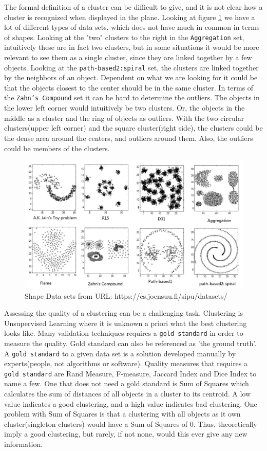 \documentclass[a4paper,10pt]{article}
\theoremstyle{plain}
\theoremstyle{definition}
\begin{document}
The formal definition of a cluster can be difficult to give, and it is not clear how a cluster is recognized when displayed in the plane. Looking at figure \ref{shapeDataSets} we have a lot of different types of data sets, which does not have much in common in terms of shapes. Looking at the "two" clusters to the right in the \texttt{Aggregation} set, intuitively these are in fact two clusters, but in some situations it would be more relevant to see them as a single cluster, since they are linked together by a few objects. Looking at the \texttt{path-based2:spiral} set, the clusters are linked together by the neighbors of an object. Dependent on what we are looking for it could be that the objects closest to the center should be in the same cluster. In terms of the \texttt{Zahn's Compound} set it can be hard to determine the outliers. The objects in the lower left corner would intuitively be two clusters. Or, the objects in the middle as a cluster and the ring of objects as outliers. With the two circular clusters(upper left corner) and the square cluster(right side), the clusters could be the dense area around the centers, and outliers around them. Also, the outliers could be members of the clusters. 
\begin{figure}[H]
	\centering
	\includegraphics[scale=0.4]{./pictures/shapeDataSet/shapeDataSet.png}
	\caption{Shape Data sets from URL: https://cs.joensuu.fi/sipu/datasets/}
	\label{shapeDataSets}
\end{figure}

Assessing the quality of a clustering can be a challenging task. Clustering is Unsupervised Learning where it is unknown a priori what the best clustering looks like. Many validation techniques requires a \texttt{gold standard} in order to measure the quality. Gold standard can also be referenced as 'the ground truth'. A \texttt{gold standard} to a given data set is a solution developed manually by experts(people, not algorithms or software). Quality measures that requires a \texttt{gold standard} are Rand Measure, F-measure, Jaccard Index and Dice Index to name a few. One that does not need a gold standard is Sum of Squares which calculates the sum of distances of all objects in a cluster to its centroid. A low value indicates a good clustering, and a high value indicates bad clustering. One problem with Sum of Squares is that a clustering with all objects as it own cluster(singleton clusters) would have a Sum of Squares of 0. Thus, theoretically imply a good clustering, but rarely, if not none, would this ever give any new information.
\end{document}
